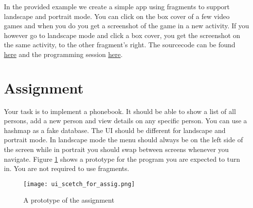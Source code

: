 In the provided example we create a simple app using fragments to support landscape and portrait mode. You can click on the box cover of a few video games and when you do you get a screenshot of the game in a new activity. If you however go to landscape mode and click a box cover, you get the screenshot on the same activity, to the other fragment's right. The sourcecode can be found \href{https://github.com/JonSteinn/AndroidDevelopment/tree/master/examples/lab3/fragments}{here} and the programming session \href{TODO}{here}.

\section{Assignment}
Your task is to implement a phonebook. It should be able to show a list of all persons, add a new person and view details on any specific person. You can use a hashmap as a fake database. The UI should be different for landscape and portrait mode. In landscape mode the menu should always be on the left side of the screen while in portrait you should swap between screens whenever you navigate. Figure \ref{fig:scetch} shows a prototype for the program you are expected to turn in. You are not required to use fragments.

\begin{figure}[H]
\centering
\texttt{[image: ui\_scetch\_for\_assig.png]}
\caption{A prototype of the assignment}
\label{fig:scetch}
\end{figure}